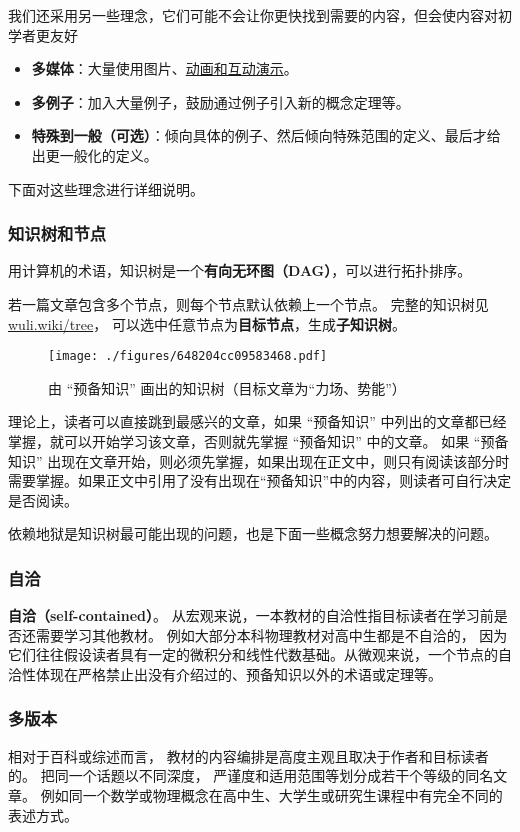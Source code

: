 我们还采用另一些理念，它们可能不会让你更快找到需要的内容，但会使内容对初学者更友好
\begin{itemize}
\item \textbf{多媒体}：大量使用图片、\href{https://wuli.wiki/apps/}{动画和互动演示}。
\item \textbf{多例子}：加入大量例子，鼓励通过例子引入新的概念定理等。
\item \textbf{特殊到一般（可选）}：倾向具体的例子、然后倾向特殊范围的定义、最后才给出更一般化的定义。
\end{itemize}
下面对这些理念进行详细说明。


\subsubsection{知识树和节点}
用计算机的术语，知识树是一个\textbf{有向无环图（DAG）}，可以进行拓扑排序。 %

若一篇文章包含多个节点，则每个节点默认依赖上一个节点。 完整的知识树见 \href{https://wuli.wiki/tree}{wuli.wiki/tree}， 可以选中任意节点为\textbf{目标节点}，生成\textbf{子知识树}。

\begin{figure}[ht]
\centering
\texttt{[image: ./figures/648204cc09583468.pdf]}
\caption{由 “预备知识” 画出的知识树（目标文章为“力场、势能”）}\label{fig_about_1}
\end{figure}

理论上，读者可以直接跳到最感兴的文章，如果 “预备知识” 中列出的文章都已经掌握，就可以开始学习该文章，否则就先掌握 “预备知识” 中的文章。 如果 “预备知识” 出现在文章开始，则必须先掌握，如果出现在正文中，则只有阅读该部分时需要掌握。如果正文中引用了没有出现在“预备知识”中的内容，则读者可自行决定是否阅读。

依赖地狱是知识树最可能出现的问题，也是下面一些概念努力想要解决的问题。

\subsubsection{自洽}
\textbf{自洽（self-contained）}。 从宏观来说，一本教材的自洽性指目标读者在学习前是否还需要学习其他教材。 例如大部分本科物理教材对高中生都是不自洽的， 因为它们往往假设读者具有一定的微积分和线性代数基础。从微观来说，一个节点的自洽性体现在严格禁止出没有介绍过的、预备知识以外的术语或定理等。

\subsubsection{多版本}
相对于百科或综述而言， 教材的内容编排是高度主观且取决于作者和目标读者的。 把同一个话题以不同深度， 严谨度和适用范围等划分成若干个等级的同名文章。 例如同一个数学或物理概念在高中生、大学生或研究生课程中有完全不同的表述方式。

